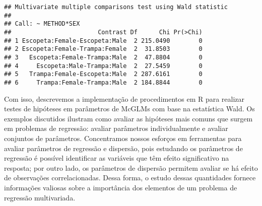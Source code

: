 \begin{knitrout}
\color{fgcolor}\begin{kframe}
\begin{alltt}
\hlstd{(} 
                  \hlstd{=} \hlstd{(}\hlstd{,} \hlstd{),}
                  
\end{alltt}
\begin{verbatim}
## Multivariate multiple comparisons test using Wald statistic
## 
## Call: ~ METHOD*SEX
##                        Contrast Df      Chi Pr(>Chi)
## 1 Escopeta:Female-Escopeta:Male  2 215.0490        0
## 2 Escopeta:Female-Trampa:Female  2  31.8503        0
## 3   Escopeta:Female-Trampa:Male  2  47.8804        0
## 4     Escopeta:Male-Trampa:Male  2  27.5459        0
## 5   Trampa:Female-Escopeta:Male  2 287.6161        0
## 6     Trampa:Female-Trampa:Male  2 184.8844        0
\end{verbatim}
\end{kframe}
\end{knitrout}



Com isso, descrevemos a implementação de procedimentos em R para realizar testes de hipóteses em parâmetros de McGLMs com base na estatística Wald. Os exemplos discutidos ilustram como avaliar as hipóteses mais comuns que surgem em problemas de regressão: avaliar parâmetros individualmente e avaliar conjuntos de parâmetros. Concentramos nossos esforços em ferramentas para avaliar parâmetros de regressão e dispersão, pois estudando os parâmetros de regressão é possível identificar as variáveis que têm efeito significativo na resposta; por outro lado, os parâmetros de dispersão permitem avaliar se há efeito de observações correlacionadas. Dessa forma, o estudo dessas quantidades fornece informações valiosas sobre a importância dos elementos de um problema de regressão multivariada.
